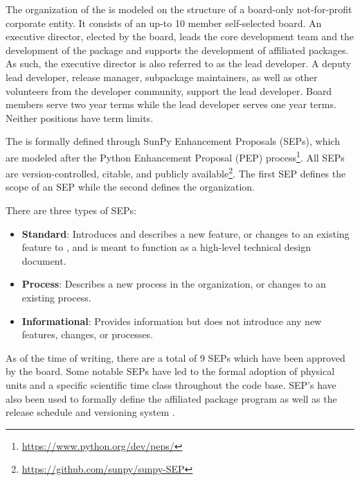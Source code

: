 The organization of the \sunpyproj is modeled on the structure of a board-only not-for-profit corporate entity.
It consists of an up-to 10 member self-selected board.
An executive director, elected by the board, leads the core development team and the development of the \sunpypkg  package and supports the development of affiliated packages.
As such, the executive director is also referred to as the lead developer.
A deputy lead developer, release manager, subpackage maintainers, as well as other volunteers from the developer community, support the lead developer.
Board members serve two year terms while the lead developer serves one year terms. Neither positions have term limits.

The \sunpyproj is formally defined through SunPy Enhancement Proposals (SEPs), which are modeled after the Python Enhancement Proposal (PEP) process\footnote{\url{https://www.python.org/dev/peps/}}.
All SEPs are version-controlled, citable, and publicly available\footnote{\url{https://github.com/sunpy/sunpy-SEP}}.
The first SEP \citep[SEP-0001][]{sep-0001} defines the scope of an SEP \citep[similar to][]{ape-0001} while the second \citep[SEP-0002][]{sep-0002} defines the  \sunpyproj organization.

There are three types of SEPs:
\begin{itemize}
    \item \textbf{Standard}: Introduces and describes a new feature, or changes to an existing feature to \sunpypkg, and is meant to function as a high-level technical design document.
    \item \textbf{Process}: Describes a new process in the organization, or changes to an existing process.
    \item \textbf{Informational}: Provides information but does not introduce any new features, changes, or processes.
\end{itemize}

As of the time of writing, there are a total of 9 SEPs which have been approved by the board.
Some notable SEPs have led to the formal adoption of physical units \citep[SEP-0003,][see \autoref{sec:units}]{sep-0003} and a specific scientific time class \citep[SEP-0008,][see \autoref{sec:units}]{sep-0008} throughout the code base.
SEP's have also been used to formally define the affiliated package program \citep[SEP-0004,][see \autoref{sec:affil_package}]{sep-0004} as well as the release schedule and versioning system \citep[SEP-0009,][see \autoref{sec:release}]{sep-0009}.
